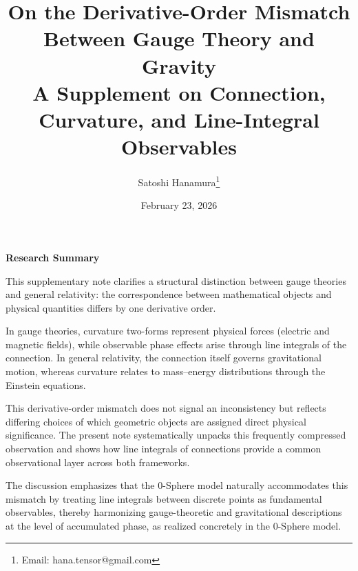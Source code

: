 \documentclass[12pt,letterpaper]{article}
\begin{document}
\title{On the Derivative-Order Mismatch\\ Between Gauge Theory and Gravity\\
\normalsize A Supplement on Connection, Curvature, and Line-Integral Observables}


\author{Satoshi Hanamura\thanks{Email: hana.tensor@gmail.com}}
\date{February 23, 2026}

\maketitle

\tableofcontents

\clearpage

\begin{center}
\textbf{Research Summary}
\end{center}

\justifying
This supplementary note clarifies a structural distinction between gauge theories and general relativity: the correspondence between mathematical objects and physical quantities differs by one derivative order.

In gauge theories, curvature two-forms represent physical forces (electric and magnetic fields), while observable phase effects arise through line integrals of the connection. In general relativity, the connection itself governs gravitational motion, whereas curvature relates to mass--energy distributions through the Einstein equations.

This derivative-order mismatch does not signal an inconsistency but reflects differing choices of which geometric objects are assigned direct physical significance. The present note systematically unpacks this frequently compressed observation and shows how line integrals of connections provide a common observational layer across both frameworks.

The discussion emphasizes that the 0-Sphere model naturally accommodates this mismatch by treating line integrals between discrete points as fundamental observables, thereby harmonizing gauge-theoretic and gravitational descriptions at the level of accumulated phase, as realized concretely in the 0-Sphere model.

\clearpage

\end{document}
